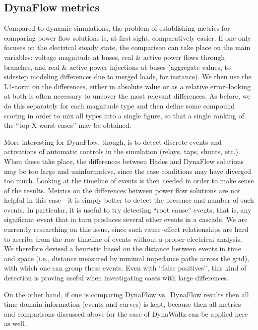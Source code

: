 \documentclass[conference]{IEEEtran}
\begin{document}
\subsection{DynaFlow metrics}

Compared to dynamic simulations, the problem of establishing metrics
for comparing power flow solutions is, at first sight, comparatively
easier. If one only focuses on the electrical steady state, the
comparison can take place on the main variables: voltage magnitude at
buses, real \& active power flows through branches, and real \& active
power injections at buses (aggregate values, to sidestep modeling
differences due to merged loads, for instance). We then use the
L1-norm on the differences, either in absolute value or as a relative
error--looking at both is often necessary to uncover the most relevant
differences. As before, we do this separately for each magnitude type
and then define some compound scoring in order to mix all types into a
single figure, so that a single ranking of the ``top X worst
cases'' may be obtained.

More interesting for DynaFlow, though, is to detect discrete events
and activations of automatic controls in the simulation (relays, taps,
shunts, etc.).  When these take place, the differences between Hades
and DynaFlow solutions may be too large and uninformative, since the
case conditions may have diverged too much.  Looking at the timeline
of events is then needed in order to make sense of the results.
Metrics on the differences between power flow solutions are not helpful
in this case---it is simply better to detect the presence and number
of such events.  In particular, it is useful to try detecting ``root
cause'' events, that is, any significant event that in turn produces
several other events in a cascade.  We are currently researching on
this issue, since such cause--effect relationships are hard to ascribe
from the raw timeline of events without a proper electrical
analysis. We therefore devised a heuristic based on the distance
between events in time and space (i.e., distance measured by minimal
impedance paths across the grid), with which one can group these
events.  Even with ``false positives'', this kind of detection is
proving useful when investigating cases with large differences.

On the other hand, if one is comparing DynaFlow vs.\ DynaFlow results
then all time-domain information (events and curves) is kept, because
then all metrics and comparisons discussed above for the case of
DynaWaltz can be applied here as well.
\end{document}
